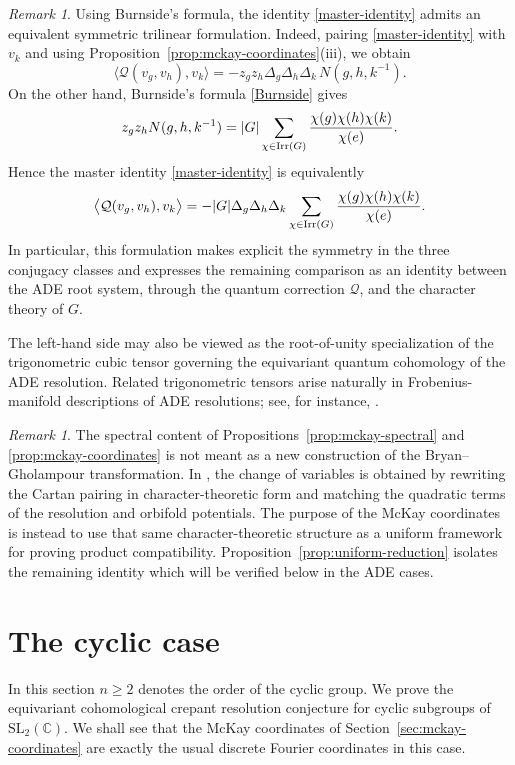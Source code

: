 \documentclass[a4paper,reqno]{amsart}
\theoremstyle{plain} %
\theoremstyle{definition} %
\theoremstyle{remark} %
\newtheorem{rmk}[thm]{Remark}
\newcommand{\1}{\mathds{1}}   %
\begin{document}
\begin{rmk}
Using Burnside's formula, the identity \eqref{master-identity}
admits an equivalent symmetric trilinear formulation. Indeed, pairing
\eqref{master-identity} with $v_k$ and using Proposition~\ref{prop:mckay-coordinates}(iii), we obtain
\[
 \bigl\langle \mathcal Q(v_g,v_h),v_k\bigr\rangle
 =
 -z_gz_h\Delta_g\Delta_h\Delta_k\,
 N(g,h,k^{-1}).
\]
On the other hand, Burnside's formula \eqref{Burnside} gives
\[
 z_gz_h N(g,h,k^{-1})
 =
 |G|\sum_{\chi\in{\rm Irr}(G)}
 \frac{\chi(g)\chi(h)\chi(k)}{\chi(e)}.
\]
Hence the master identity \eqref{master-identity} is equivalently
\[
 \bigl\langle \mathcal Q(v_g,v_h),v_k\bigr\rangle
 =
 -|G|\Delta_g\Delta_h\Delta_k
 \sum_{\chi\in{\rm Irr}(G)}
 \frac{\chi(g)\chi(h)\chi(k)}{\chi(e)}
 .
\]
In particular, this formulation makes explicit the symmetry in the three
conjugacy classes and expresses the remaining comparison as an identity
between the ADE root system, through the quantum correction $\mathcal Q$,
and the character theory of $G$.

The left-hand side may also be viewed as the root-of-unity specialization
of the trigonometric cubic tensor governing the equivariant quantum
cohomology of the ADE resolution. Related trigonometric tensors arise
naturally in Frobenius-manifold descriptions of ADE resolutions; see, for
instance, \cite{BMS25}.
\end{rmk}

\begin{rmk}\label{rmk:BG-origin}
The spectral content of Propositions~\ref{prop:mckay-spectral} and
\ref{prop:mckay-coordinates} is not meant as a new construction of the
Bryan--Gholampour transformation. In \cite[Sec.~5]{bryan2008root}, the change
of variables is obtained by rewriting the Cartan pairing in character-theoretic
form and matching the quadratic terms of the resolution and orbifold
potentials. The purpose of the McKay coordinates is instead to use that same
character-theoretic structure as a uniform framework for proving product
compatibility. Proposition~\ref{prop:uniform-reduction} isolates the remaining
identity which will be verified below in the ADE cases.
\end{rmk}

\section{The cyclic case}\label{sec:cyclic}

In this section \(n\geq 2\) denotes the order of the cyclic group.
We prove the equivariant cohomological crepant resolution conjecture
for cyclic subgroups of \(\mathrm{SL}_2(\mathbb{C})\). We shall see that the
McKay coordinates of Section~\ref{sec:mckay-coordinates} are exactly the usual
discrete Fourier coordinates in this case.
\end{document}

